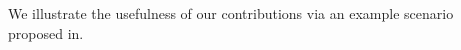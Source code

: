 
We illustrate the usefulness of our contributions via an example scenario proposed in\cite{ghosh2020justicia}. 




